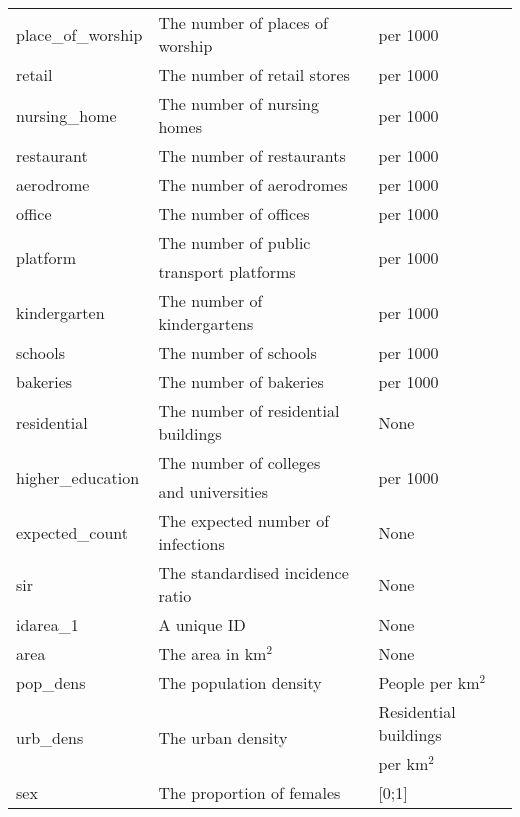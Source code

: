 \begin{table}[H]
\begin{tabular}{l l l}
place\_of\_worship & The number of places of worship & per 1000 \\
retail & The number of retail stores & per 1000 \\
nursing\_home & The number of nursing homes & per 1000 \\
restaurant & The number of restaurants & per 1000 \\
aerodrome & The number of aerodromes & per 1000 \\
office & The number of offices & per 1000 \\
\multirow{2}{*}{platform} & The number of public & \multirow{2}{*}{per 1000} \\
& transport platforms \\
kindergarten & The number of kindergartens & per 1000 \\
schools & The number of schools & per 1000 \\
bakeries & The number of bakeries & per 1000 \\
residential & The number of residential buildings & None \\
\multirow{2}{*}{higher\_education} & The number of colleges & \multirow{2}{*}{per 1000} \\
& and universities \\
expected\_count & The expected number of infections & None \\
sir & The standardised incidence ratio & None \\
idarea\_1 & A unique ID & None \\
area & The area in km$^2$ & None \\
pop\_dens & The population density & People per km$^2$ \\
\multirow{2}{*}{urb\_dens} & \multirow{2}{*}{The urban density}  & Residential buildings\\
& & per km$^2$\\
sex & The proportion of females & [0;1] \\
\bottomrule
\end{tabular}
\end{table}
